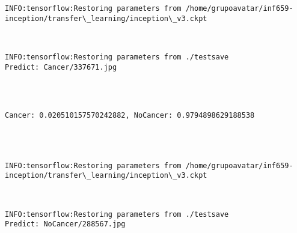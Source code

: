 \documentclass[11pt]{article}
\begin{document}
    \begin{Verbatim}[commandchars=\\\{\}]
INFO:tensorflow:Restoring parameters from /home/grupoavatar/inf659-inception/transfer\_learning/inception\_v3.ckpt

    \end{Verbatim}

    \begin{center}
    \end{center}
    { \hspace*{\fill} \\}
    
    \begin{Verbatim}[commandchars=\\\{\}]
INFO:tensorflow:Restoring parameters from ./testsave
Predict: Cancer/337671.jpg


    \end{Verbatim}

    \begin{center}
    \end{center}
    { \hspace*{\fill} \\}
    
    \begin{Verbatim}[commandchars=\\\{\}]
Cancer: 0.020510157570242882, NoCancer: 0.9794898629188538




INFO:tensorflow:Restoring parameters from /home/grupoavatar/inf659-inception/transfer\_learning/inception\_v3.ckpt

    \end{Verbatim}

    \begin{center}
    \end{center}
    { \hspace*{\fill} \\}
    
    \begin{Verbatim}[commandchars=\\\{\}]
INFO:tensorflow:Restoring parameters from ./testsave
Predict: NoCancer/288567.jpg


    \end{Verbatim}
\end{document}
